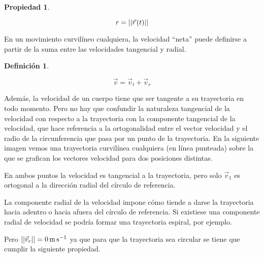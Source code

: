 \documentclass[a5paper,12pt,twoside]{book}
\newtheorem{defn}{{Definición}}[chapter]
\newtheorem{prop}{{Propiedad}}[chapter]
\begin{document}
\begin{mdframed}[style=MyFrame1]
    \begin{prop}
        \label{prop:circularMovRadius}
    \end{prop}
    \begin{equation*}
        r = {\left|\left| {\vec{r}\hspace{0.05cm}(t)} \right|\right|}
    \end{equation*}
\end{mdframed}

En un movimiento curvilíneo cualquiera, la velocidad ``neta'' puede definirse a partir de la suma entre las velocidades tangencial y radial.

\begin{mdframed}[style=MyFrame1]
    \begin{defn}
    \end{defn}
    \begin{equation*}
        \Vec{v} = \Vec{v}_t + \Vec{v}_r
    \end{equation*}
\end{mdframed}

Además, la velocidad de un cuerpo tiene que ser tangente a su trayectoria en todo momento. Pero no hay que confundir la naturaleza tangencial de la velocidad con respecto a la trayectoria con la componente tangencial de la velocidad, que hace referencia a la ortogonalidad entre el vector velocidad y el radio de la circunferencia que pasa por un punto de la trayectoria. En la siguiente imagen vemos una trayectoria curvilínea cualquiera (en línea punteada) sobre la que se grafican los vectores velocidad para dos posiciones distintas.

\begin{center}
    \vspace{-5cm}
    \def\svgwidth{\linewidth}
    
    \vspace{-6cm}
\end{center}

En ambos puntos la velocidad es tangencial a la trayectoria, pero solo $\vec{v}_1$ es ortogonal a la dirección radial del círculo de referencia.

La componente radial de la velocidad impone cómo tiende a darse la trayectoria hacia adentro o hacia afuera del círculo de referencia. Si existiese una componente radial de velocidad se podría formar una trayectoria espiral, por ejemplo.

Pero ${\left|\left| {\Vec{v}_r} \right|\right|} = \SI{0}{\metre\per\second}$ ya que para que la trayectoria sea circular se tiene que cumplir la siguiente propiedad.
\end{document}
